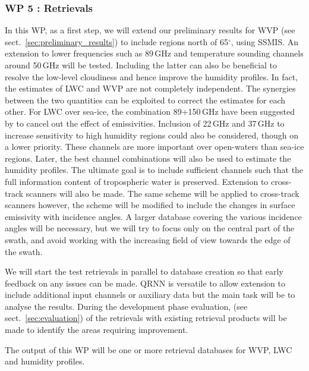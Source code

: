 \documentclass[12pt,oneside,a4paper]{article}
\begin{document}
\subsubsection*{WP 5 : Retrievals}
%
\label{sec:retrievals}
%
In this WP, as a first step, we will extend our preliminary results for WVP (see sect.~\ref{sec:preliminary_results}) to include regions north of 65$^\circ$, using SSMIS.  An extension to lower frequencies such as  89\,GHz and temperature sounding channels around 50\,GHz will be tested. Including the latter can also be beneficial to resolve the low-level cloudiness and hence improve the humidity profiles. In fact, the estimates of LWC and WVP are not completely independent. The synergies between the two quantities can be exploited to correct the estimates for each other. For LWC over sea-ice, the combination 89+150\,GHz have been suggested by \citet{laue:2007:poten} to cancel out the effect of emissivities. Inclusion of 22\,GHz and 37\,GHz to increase sensitivity to high humidity regions could also be considered, though on a lower priority. These channels are more important over open-waters than sea-ice regions. Later, the best channel combinations will also be used to estimate the humidity profiles. The ultimate goal is to include sufficient channels such that the full information content of tropospheric water is preserved. Extension to cross-track scanners will also be made. The same scheme will be applied to cross-track scanners however, the scheme will be modified to include the changes in surface emissivity with incidence angles. A larger database covering the various incidence angles will be necessary, but we will try to focus only on the central part of the swath, and avoid working with the increasing field of view towards the edge of the swath. 

We will start the test retrievals in parallel to database creation so that early feedback on any issues can be made. QRNN is versatile to allow extension to include additional input channels or auxiliary data but the main task will be to analyse the results. During the development phase evaluation, (see sect.~\ref{sec:evaluation}) of the retrievals with existing retrieval products will be made to identify the areas requiring improvement.

The output of this WP will be one or more retrieval databases for WVP, LWC and humidity profiles.
\end{document}
